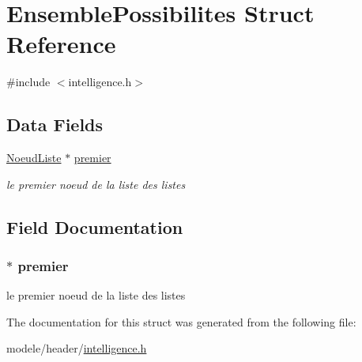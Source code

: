 \hypertarget{struct_ensemble_possibilites}{\section{Ensemble\-Possibilites Struct Reference}
\label{struct_ensemble_possibilites}
}


{\ttfamily \#include $<$intelligence.\-h$>$}

\subsection*{Data Fields}
\begin{DoxyCompactItemize}
\item 
\hyperlink{struct_noeud_liste}{Noeud\-Liste} $\ast$ \hyperlink{struct_ensemble_possibilites_a055de8f5ce347cedefb201cfa5c22888}{premier}
\begin{DoxyCompactList}\small\item\em le premier noeud de la liste des listes \end{DoxyCompactList}\end{DoxyCompactItemize}


\subsection{Field Documentation}
\hypertarget{struct_ensemble_possibilites_a055de8f5ce347cedefb201cfa5c22888}{
\subsubsection[{premier}]{$\ast$ premier}}\label{struct_ensemble_possibilites_a055de8f5ce347cedefb201cfa5c22888}


le premier noeud de la liste des listes 



The documentation for this struct was generated from the following file\-:\begin{DoxyCompactItemize}
\item 
modele/header/\hyperlink{intelligence_8h}{intelligence.\-h}\end{DoxyCompactItemize}
